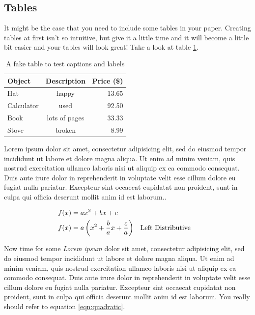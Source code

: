 \documentclass[a4paper,12pt]{article}
\begin{document}
\subsection*{Tables}\label{subsec:tables}
It might be the case that you need to include some tables in your paper.  Creating tables at first isn't so intuitive, but give it a little time and it will become a little bit easier and your tables will look great! Take a look at table \ref{table:1}.

\begin{table}[h]
  \centering
\begin{tabular}{l c r} \toprule
Object & Description & Price (\$)\\ \midrule
Hat & happy & 13.65 \\
Calculator & used & 92.50 \\
Book & lots of pages & 33.33 \\
Stove & broken & 8.99 \\ \bottomrule
\end{tabular}
    \caption{A fake table to test captions and labels}
    \label{table:1}
\end{table}

Lorem ipsum dolor sit amet, consectetur adipisicing elit, sed do eiusmod tempor incididunt ut labore et dolore magna aliqua. Ut enim ad minim veniam, quis nostrud exercitation ullamco laboris nisi ut aliquip ex ea commodo consequat. Duis aute irure dolor in reprehenderit in voluptate velit esse cillum dolore eu fugiat nulla pariatur. Excepteur sint occaecat cupidatat non proident, sunt in culpa qui officia deserunt mollit anim id est laborum.\cite{mathworld:algebraicexpression}\cite{mathworld:completethesquare}.

\begin{align}
  f(x) &= ax^2+bx+c \label{eqn:quadratic} \\
  f(x) &= a\left(x^2 + \frac{b}{a}x + \frac{c}{a} \right) && \text{Left Distributive}
\end{align}

Now time for some \textit{Lorem ipsum} dolor sit amet, consectetur adipisicing elit, sed do eiusmod tempor incididunt ut labore et dolore magna aliqua. Ut enim ad minim veniam, quis nostrud exercitation ullamco laboris nisi ut aliquip ex ea commodo consequat. Duis aute irure dolor in reprehenderit in voluptate velit esse cillum dolore eu fugiat nulla pariatur. Excepteur sint occaecat cupidatat non proident, sunt in culpa qui officia deserunt mollit anim id est laborum. You really should refer to equation \ref{eqn:quadratic}.
\end{document}
